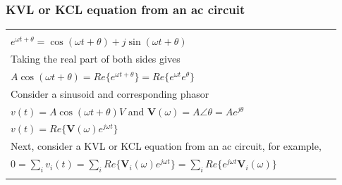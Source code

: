\documentclass[aspectratio=169]{beamer}
\begin{document}
\begin{frame}[fragile]
	\frametitle{KVL or KCL equation from an ac circuit}
\begin{tabular}{ll}

	\begin{columns}
\scriptsize		\begin{column}{0.5\textwidth}  %
Consider \newline \\
$e^{\omega t + \theta}= \cos(\omega t + \theta)+j \sin(\omega t + \theta)$ \newline \\ 
Taking the real part of both sides gives \newline \\
$A \cos(\omega t + \theta)=Re \{e^{\omega t + \theta}\}=Re \{e^{\omega t} e^{ \theta}\}$ \newline \\
Consider a sinusoid and corresponding phasor \newline \\
$v(t) = A \cos(\omega t + \theta) V$ and $\textbf{V}(\omega)=A \angle{\theta} = A e^{j \theta}$ \newline \\
$v(t) = Re \{\textbf{V}(\omega) e^{j \omega t}   \}$ \newline \\
		Next, consider a KVL or KCL equation from an ac circuit, for example, \newline \\
$0=\sum_{i} v_i(t) = \sum_{i} Re \{\textbf{V}_i(\omega) e^{j \omega t}   \}= \sum_{i}  Re \{ e^{j \omega t} \textbf{V}_i(\omega)    \}$ \newline \\



		\end{column}
		\begin{column}{0.5\textwidth}  %


\end{column}
\end{columns}
\end{tabular}
\end{frame}
\end{document}
